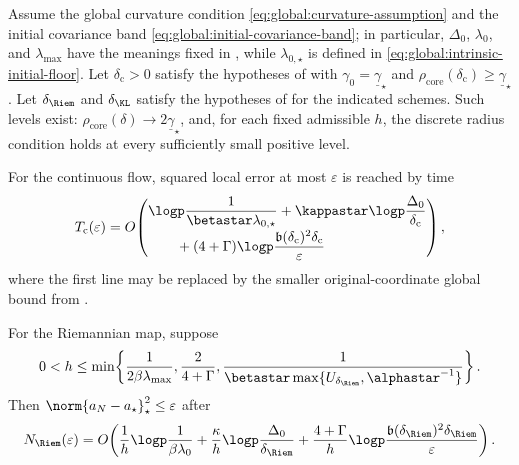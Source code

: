 \begin{theorem}
\label{thm:local-three-stage}
Assume the global curvature condition
\eqref{eq:global:curvature-assumption} and the initial covariance band
\eqref{eq:global:initial-covariance-band}; in particular,
\(\Delta_0\), \(\lambda_0\), and \(\lambda_{\max}\) have the meanings fixed
in , while \(\lambda_{0,\star}\) is defined in
\eqref{eq:global:intrinsic-initial-floor}.
Let \(\delta_{\mathrm c}>0\) satisfy the hypotheses of
 with
\(\gamma_0=\underline\gamma_\star\) and
\(\rho_{\mathrm{core}}(\delta_{\mathrm c})
\geq\underline\gamma_\star\).  Let
\(\delta_{\Riem}\) and \(\delta_{\KL}\) satisfy the hypotheses of
 for the indicated schemes.  Such
levels exist: \(\rho_{\mathrm{core}}(\delta)\to
2\underline\gamma_\star\), and, for each fixed admissible \(h\), the
discrete radius condition holds at every sufficiently small positive level.

For the continuous flow, squared local error at most \(\varepsilon\) is
reached by time
\begin{equation}
  T_{\mathrm c}(\varepsilon)
  =O\!\left(
  \begin{aligned}
    &\logp\frac1{\betastar\lambda_{0,\star}}
    +\kappastar\logp\frac{\Delta_0}{\delta_{\mathrm c}}\\[-1mm]
    &\qquad +(4+\Gamma)
      \logp\frac{\mathfrak b(\delta_{\mathrm c})^2
                       \delta_{\mathrm c}}{\varepsilon}
  \end{aligned}
  \right),
  \label{eq:local-three-stage-continuous}
\end{equation}
where the first line may be replaced by the smaller original-coordinate
global bound from .

For the Riemannian map, suppose
\[
  0<h\leq\min\!\left\{
    \frac1{2\beta\lambda_{\max}},
    \frac2{4+\Gamma},
    \frac1{\betastar
      \max\{U_{\delta_{\Riem}},\alphastar^{-1}\}}
  \right\}.
\]
Then \(\norm{a_N-a_\star}_\star^2\leq\varepsilon\) after
\begin{equation}
  N_{\Riem}(\varepsilon)
  =O\!\left(
    \frac1h\logp\frac1{\beta\lambda_0}
    +\frac\kappa h\logp\frac{\Delta_0}{\delta_{\Riem}}
    +\frac{4+\Gamma}{h}
       \logp\frac{\mathfrak b(\delta_{\Riem})^2
                        \delta_{\Riem}}{\varepsilon}
  \right).
  \label{eq:local-three-stage-riemannian}
\end{equation}


\end{theorem}
